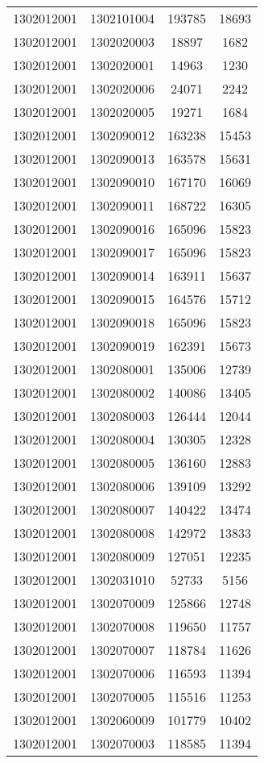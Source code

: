 \begin{longtable}{llcc}
1302012001 & 1302101004 & 193785 & 18693\\
1302012001 & 1302020003 & 18897 & 1682\\
1302012001 & 1302020001 & 14963 & 1230\\
1302012001 & 1302020006 & 24071 & 2242\\
1302012001 & 1302020005 & 19271 & 1684\\
1302012001 & 1302090012 & 163238 & 15453\\
1302012001 & 1302090013 & 163578 & 15631\\
1302012001 & 1302090010 & 167170 & 16069\\
1302012001 & 1302090011 & 168722 & 16305\\
1302012001 & 1302090016 & 165096 & 15823\\
1302012001 & 1302090017 & 165096 & 15823\\
1302012001 & 1302090014 & 163911 & 15637\\
1302012001 & 1302090015 & 164576 & 15712\\
1302012001 & 1302090018 & 165096 & 15823\\
1302012001 & 1302090019 & 162391 & 15673\\
1302012001 & 1302080001 & 135006 & 12739\\
1302012001 & 1302080002 & 140086 & 13405\\
1302012001 & 1302080003 & 126444 & 12044\\
1302012001 & 1302080004 & 130305 & 12328\\
1302012001 & 1302080005 & 136160 & 12883\\
1302012001 & 1302080006 & 139109 & 13292\\
1302012001 & 1302080007 & 140422 & 13474\\
1302012001 & 1302080008 & 142972 & 13833\\
1302012001 & 1302080009 & 127051 & 12235\\
1302012001 & 1302031010 & 52733 & 5156\\
1302012001 & 1302070009 & 125866 & 12748\\
1302012001 & 1302070008 & 119650 & 11757\\
1302012001 & 1302070007 & 118784 & 11626\\
1302012001 & 1302070006 & 116593 & 11394\\
1302012001 & 1302070005 & 115516 & 11253\\
1302012001 & 1302060009 & 101779 & 10402\\
1302012001 & 1302070003 & 118585 & 11394\\

\end{longtable}
